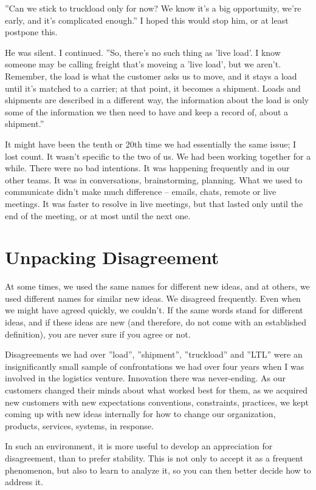 \documentclass[graybox,envcountchap,sectrefs]{svmono}
\begin{document}
''Can we stick to truckload only for now? We know it’s a big opportunity, we're early, and it's complicated enough.'' I hoped this would stop him, or at least postpone this.

He was silent. I continued. ''So, there's no such thing as 'live load'. I know someone may be calling freight that's moveing a 'live load', but we aren't. Remember, the load is what the customer asks us to move, and it stays a load until it's matched to a carrier; at that point, it becomes a shipment. Loads and shipments are described in a different way, the information about the load is only some of the information we then need to have and keep a record of, about a shipment.'' 

It might have been the tenth or 20th time we had essentially the same issue; I lost count. It wasn't specific to the two of us. We had been working together for a while. There were no bad intentions. It was happening frequently and in our other teams. It was in conversations, brainstorming, planning. What we used to communicate didn't make much difference -- emails, chats, remote or live meetings. It was faster to resolve in live meetings, but that lasted only until the end of the meeting, or at most until the next one.

\section{Unpacking Disagreement}
\label{s:unpacking-disagreement}
At some times, we used the same names for different new ideas, and at others, we used different names for similar new ideas. We disagreed frequently. Even when we might have agreed quickly, we couldn't. If the same words stand for different ideas, and if these ideas are new (and therefore, do not come with an established definition), you are never sure if you agree or not. 

Disagreements we had over ''load'', ''shipment'', ''truckload'' and ''LTL'' were an insignificantly small sample of confrontations we had over four years when I was involved in the logistics venture. Innovation there was never-ending. As our customers changed their minds about what worked best for them, as we acquired new customers with new expectations conventions, constraints, practices, we kept coming up with new ideas internally for how to change our organization, products, services, systems, in response.

In such an environment, it is more useful to develop an appreciation for disagreement, than to prefer stability. This is not only to accept it as a frequent phenomenon, but also to learn to analyze it, so you can then better decide how to address it. 
\end{document}

